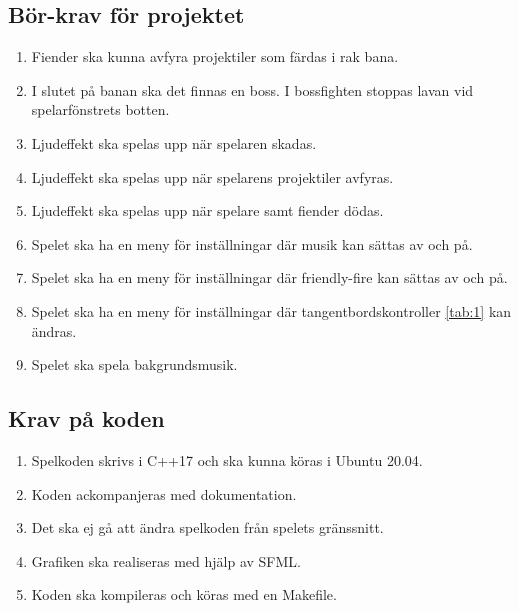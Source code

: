 \documentclass{TDP005mall}
\begin{document}
\subsection{Bör-krav för projektet}
\begin{enumerate}
\item Fiender ska kunna avfyra projektiler som färdas i rak bana.
\item I slutet på banan ska det finnas en boss. I bossfighten stoppas lavan vid spelarfönstrets botten.
\item Ljudeffekt ska spelas upp när spelaren skadas.
\item Ljudeffekt ska spelas upp när spelarens projektiler avfyras.
\item Ljudeffekt ska spelas upp när spelare samt fiender dödas.
\item Spelet ska ha en meny för inställningar där musik kan sättas av och på.
\item Spelet ska ha en meny för inställningar där friendly-fire kan sättas av och på.
\item Spelet ska ha en meny för inställningar där tangentbordskontroller \ref{tab:1} kan ändras.
\item Spelet ska spela bakgrundsmusik.
\end{enumerate}


\subsection{Krav på koden} %
\begin{enumerate}
\item    Spelkoden skrivs i C++17 och ska kunna köras i Ubuntu 20.04.
\item    Koden ackompanjeras med dokumentation.
\item    Det ska ej gå att ändra spelkoden från spelets gränssnitt.
\item    Grafiken ska realiseras med hjälp av SFML.
\item    Koden ska kompileras och köras med en Makefile.
\end{enumerate}

\newpage
\printbibliography
\end{document}

